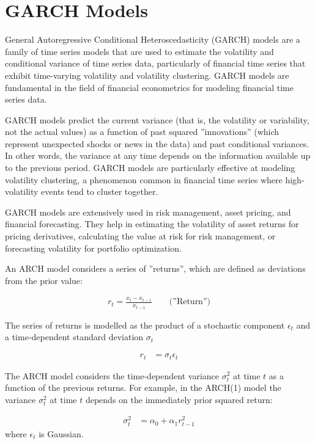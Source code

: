 \section{GARCH Models}

General Autoregressive Conditional Heteroscedasticity (GARCH) models are a family of time series models that are used to estimate the volatility and conditional variance of time series data, particularly of financial time series that exhibit time-varying volatility and volatility clustering. GARCH models are fundamental in the field of financial econometrics for modeling financial time series data.

GARCH models predict the current variance (that is, the volatility or variability, not the actual values) as a function of past squared ''innovations'' (which represent unexpected shocks or news in the data) and past conditional variances. In other words, the variance at any time depends on the information available up to the previous period. GARCH models are particularly effective at modeling volatility clustering, a phenomenon common in financial time series where high-volatility events tend to cluster together.

GARCH models are extensively used in risk management, asset pricing, and financial forecasting. They help in estimating the volatility of asset returns for pricing derivatives, calculating the value at risk for risk management, or forecasting volatility for portfolio optimization. 

An ARCH model considers a series of ''returns'', which are defined as deviations from the prior value:

\begin{align*}
r_t = \frac{x_t - x_{t-1}}{x_{t-1}} \qquad \text{(''Return'')}
\end{align*}

The series of returns is modelled as the product of a stochastic component $\epsilon_t$ and a time-dependent standard deviation $\sigma_t$

\begin{align*}
r_t &= \sigma_t \epsilon_t
\end{align*}

The ARCH model considers the time-dependent variance $\sigma_t^2$ at time $t$ as a function of the previous returns. For example, in the ARCH(1) model the variance $\sigma_t^2$ at time $t$ depends on the immediately prior squared return:

\begin{align*}
\sigma_t^2 &= \alpha_0 + \alpha_1 r_{t-1}^2
\end{align*}
\noindent where $\epsilon_t$ is Gaussian.

